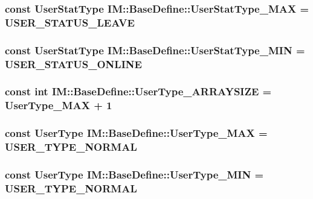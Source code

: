 \subsubsection[{User\+Stat\+Type\+\_\+\+M\+A\+X}]{\setlength{\rightskip}{0pt plus 5cm}const {\bf User\+Stat\+Type} I\+M\+::\+Base\+Define\+::\+User\+Stat\+Type\+\_\+\+M\+A\+X = {\bf U\+S\+E\+R\+\_\+\+S\+T\+A\+T\+U\+S\+\_\+\+L\+E\+A\+V\+E}}\label{namespace_i_m_1_1_base_define_ae1f01f6be0b89d484aaf18cd5165a849}
\hypertarget{namespace_i_m_1_1_base_define_a2b239926a33b1c16504caa2f6493b01b}{}
\subsubsection[{User\+Stat\+Type\+\_\+\+M\+I\+N}]{\setlength{\rightskip}{0pt plus 5cm}const {\bf User\+Stat\+Type} I\+M\+::\+Base\+Define\+::\+User\+Stat\+Type\+\_\+\+M\+I\+N = {\bf U\+S\+E\+R\+\_\+\+S\+T\+A\+T\+U\+S\+\_\+\+O\+N\+L\+I\+N\+E}}\label{namespace_i_m_1_1_base_define_a2b239926a33b1c16504caa2f6493b01b}
\hypertarget{namespace_i_m_1_1_base_define_a999490818b55f8c942a3182e9e2b6a49}{}
\subsubsection[{User\+Type\+\_\+\+A\+R\+R\+A\+Y\+S\+I\+Z\+E}]{\setlength{\rightskip}{0pt plus 5cm}const int I\+M\+::\+Base\+Define\+::\+User\+Type\+\_\+\+A\+R\+R\+A\+Y\+S\+I\+Z\+E = {\bf User\+Type\+\_\+\+M\+A\+X} + 1}\label{namespace_i_m_1_1_base_define_a999490818b55f8c942a3182e9e2b6a49}
\hypertarget{namespace_i_m_1_1_base_define_af34cc43f9c2459cd4586ee7560f5b3de}{}
\subsubsection[{User\+Type\+\_\+\+M\+A\+X}]{\setlength{\rightskip}{0pt plus 5cm}const {\bf User\+Type} I\+M\+::\+Base\+Define\+::\+User\+Type\+\_\+\+M\+A\+X = {\bf U\+S\+E\+R\+\_\+\+T\+Y\+P\+E\+\_\+\+N\+O\+R\+M\+A\+L}}\label{namespace_i_m_1_1_base_define_af34cc43f9c2459cd4586ee7560f5b3de}
\hypertarget{namespace_i_m_1_1_base_define_a3ef9c238572cf7d7efbc2930136f6916}{}
\subsubsection[{User\+Type\+\_\+\+M\+I\+N}]{\setlength{\rightskip}{0pt plus 5cm}const {\bf User\+Type} I\+M\+::\+Base\+Define\+::\+User\+Type\+\_\+\+M\+I\+N = {\bf U\+S\+E\+R\+\_\+\+T\+Y\+P\+E\+\_\+\+N\+O\+R\+M\+A\+L}}\label{namespace_i_m_1_1_base_define_a3ef9c238572cf7d7efbc2930136f6916}
